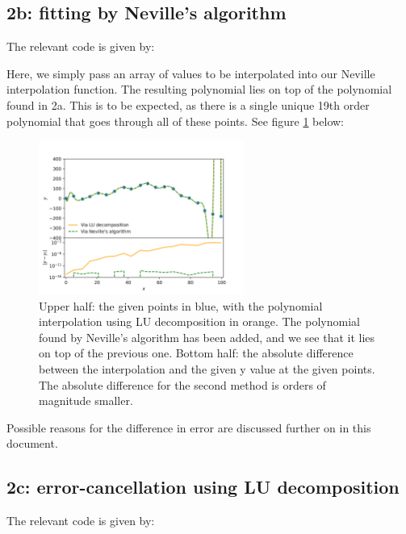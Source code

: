 

\subsection{2b: fitting by Neville's algorithm}
The relevant code is given by:


Here, we simply pass an array of values to be interpolated into our Neville interpolation function. The resulting polynomial lies on top of the polynomial found in 2a. This is to be expected, as there is a single unique 19th order polynomial that goes through all of these points. See figure \ref{fig:2b} below:

\begin{figure}[h!]
\label{fig:2b}
\caption{Upper half: the given points in blue, with the polynomial interpolation using LU decomposition in orange. The polynomial found by Neville's algorithm has been added, and we see that it lies on top of the previous one. Bottom half: the absolute difference between the interpolation and the given y value at the given points. The absolute difference for the second method is orders of magnitude smaller.}
\centering
\includegraphics[width=0.6\textwidth]{my_vandermonde_sol_2b.png}
\end{figure}



Possible reasons for the difference in error are discussed further on in this document.

\subsection{2c: error-cancellation using LU decomposition}
The relevant code is given by:


